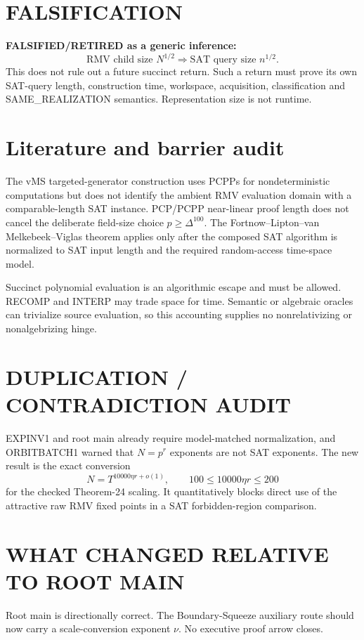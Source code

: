 \documentclass[11pt]{article}
\begin{document}
\section*{FALSIFICATION}
\textbf{FALSIFIED/RETIRED as a generic inference:}
\[
\text{RMV child size }N^{1/2}\Longrightarrow\text{SAT query size }n^{1/2}.
\]
This does not rule out a future succinct return. Such a return must prove its own SAT-query length, construction time, workspace, acquisition, classification and SAME\_REALIZATION semantics. Representation size is not runtime.

\section*{Literature and barrier audit}
The vMS targeted-generator construction uses PCPPs for nondeterministic computations but does not identify the ambient RMV evaluation domain with a comparable-length SAT instance. PCP/PCPP near-linear proof length does not cancel the deliberate field-size choice \(p\ge\Delta^{100}\). The Fortnow--Lipton--van Melkebeek--Viglas theorem applies only after the composed SAT algorithm is normalized to SAT input length and the required random-access time-space model.

Succinct polynomial evaluation is an algorithmic escape and must be allowed. RECOMP and INTERP may trade space for time. Semantic or algebraic oracles can trivialize source evaluation, so this accounting supplies no nonrelativizing or nonalgebrizing hinge.

\section*{DUPLICATION / CONTRADICTION AUDIT}
EXPINV1 and root main already require model-matched normalization, and ORBITBATCH1 warned that \(N=p^r\) exponents are not SAT exponents. The new result is the exact conversion
\[
N=T^{10000\eta r+o(1)},\qquad100\le10000\eta r\le200
\]
for the checked Theorem-24 scaling. It quantitatively blocks direct use of the attractive raw RMV fixed points in a SAT forbidden-region comparison.

\section*{WHAT CHANGED RELATIVE TO ROOT MAIN}
Root main is directionally correct. The Boundary-Squeeze auxiliary route should now carry a scale-conversion exponent \(\nu\). No executive proof arrow closes.
\end{document}
